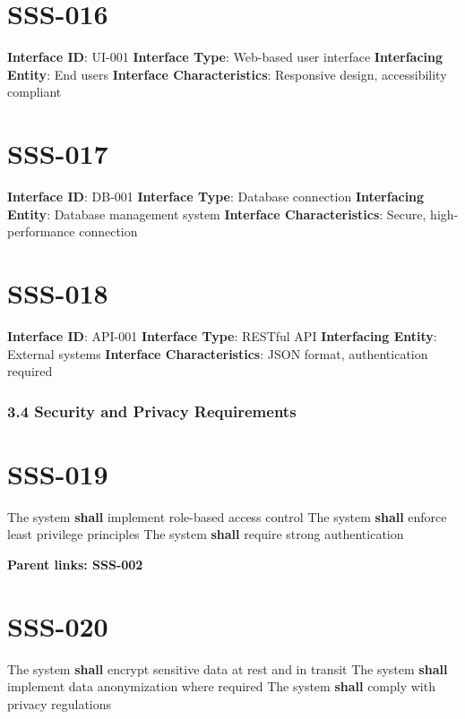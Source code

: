 \section{SSS-016}\label{SSS-016}

\textbf{Interface ID}: UI-001
\textbf{Interface Type}: Web-based user interface
\textbf{Interfacing Entity}: End users
\textbf{Interface Characteristics}: Responsive design, accessibility compliant

\section{SSS-017}\label{SSS-017}

\textbf{Interface ID}: DB-001
\textbf{Interface Type}: Database connection
\textbf{Interfacing Entity}: Database management system
\textbf{Interface Characteristics}: Secure, high-performance connection

\section{SSS-018}\label{SSS-018}

\textbf{Interface ID}: API-001
\textbf{Interface Type}: RESTful API
\textbf{Interfacing Entity}: External systems
\textbf{Interface Characteristics}: JSON format, authentication required

\subsubsection{3.4 Security and Privacy Requirements}

\section{SSS-019}\label{SSS-019}

The system \textbf{shall} implement role-based access control
The system \textbf{shall} enforce least privilege principles
The system \textbf{shall} require strong authentication

\textbf{Parent links: SSS-002}

\section{SSS-020}\label{SSS-020}

The system \textbf{shall} encrypt sensitive data at rest and in transit
The system \textbf{shall} implement data anonymization where required
The system \textbf{shall} comply with privacy regulations

